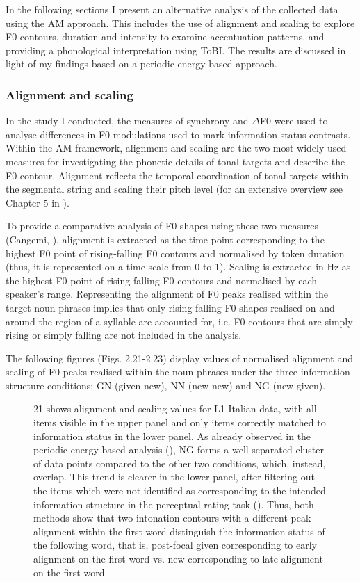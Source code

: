 In the following sections I present an alternative analysis of the collected data using the AM approach. This includes the use of alignment and scaling to explore F0 contours, duration and intensity to examine accentuation patterns, and providing a phonological interpretation using ToBI. The results are discussed in light of my findings based on a periodic-energy-based approach.

\subsubsection{Alignment and scaling}
\hypertarget{Toc191305918}{}
In the study I conducted, the measures of synchrony and ${\Delta}$F0 were used to analyse differences in F0 modulations used to mark information status contrasts. Within the AM framework, alignment and scaling are the two most widely used measures for investigating the phonetic details of tonal targets and describe the F0 contour. Alignment reflects the temporal coordination of tonal targets within the segmental string and scaling their pitch level (for an extensive overview see Chapter 5 in \citealt{Ladd2008}). 

To provide a comparative analysis of F0 shapes using these two measures (Cangemi, \citealt{AlbertGrice2019}), alignment is extracted as the time point corresponding to the highest F0 point of rising-falling F0 contours and normalised by token duration (thus, it is represented on a time scale from 0 to 1). Scaling is extracted in Hz as the highest F0 point of rising-falling F0 contours and normalised by each speaker’s range. Representing the alignment of F0 peaks realised within the target noun phrases implies that only rising-falling F0 shapes realised on and around the region of a syllable are accounted for, i.e. F0 contours that are simply rising or simply falling are not included in the analysis.

The following figures (Figs. 2.21-2.23) display values of normalised alignment and scaling of F0 peaks realised within the noun phrases under the three information structure conditions: GN (given-new), NN (new-new) and NG (new-given). 

\begin{figure}
\caption{21 shows alignment and scaling values for L1 Italian data, with all items visible in the upper panel and only items correctly matched to information status in the lower panel. As already observed in the periodic-energy based analysis (), NG forms a well-separated cluster of data points compared to the other two conditions, which, instead, overlap. This trend is clearer in the lower panel, after filtering out the items which were not identified as corresponding to the intended information structure in the perceptual rating task (). Thus, both methods show that two intonation contours with a different peak alignment within the first word distinguish the information status of the following word, that is, post-focal given corresponding to early alignment on the first word vs. new corresponding to late alignment on the first word.}
\label{fig:key:2}
\end{figure}

